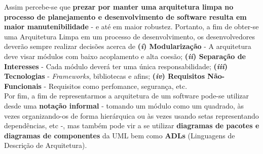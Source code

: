 \documentclass[12pt, a4paper]{article}
\newcommand{\tit}[1]{\textit{#1}}
\newcommand{\tb}[1]{\textbf{#1}}
\newcommand{\bitem}[2]{ \tb{(\tit{#1}) {#2}}}
\begin{document}
\begin{enumerate}[label=\textbf{\arabic*.}]
{           Assim percebe-se que \tb{prezar por manter uma arquitetura limpa no processo de planejamento e desenvolvimento de software resulta em maior manutenibilidade} - e até em maior robustez. Portanto, a fim de obter-se uma Arquitetura Limpa em um processo de desenvolvimento, os desenvolvedores deverão sempre realizar decisões acerca de \bitem{i}{Modularização} - A arquitetura deve visar módulos com baixo acoplamento e alta coesão; \bitem{ii}{Separação de Interesses} - Cada módulo deverá ter uma única responsabilidade; \bitem{iii}{Tecnologias} - \tit{Frameworks}, bibliotecas e afins; \bitem{iv}{Requisitos Não-Funcionais} - Requisitos como perfomance, segurança, etc. \\
           Por fim, a fim de representarmos a arquitetura de um software pode-se utilizar desde uma \tb{notação informal} - tomando um módulo como um quadrado, às vezes organizando-os de forma hierárquica ou às vezes usando setas representando dependências, etc -, mas também pode vir a se utilizar \tb{diagramas de pacotes e diagramas de componentes} da UML bem como \tb{ADLs} (Linguagens de Descrição de Arquitetura).
        } \newpage
        

\end{enumerate}
\end{document}
